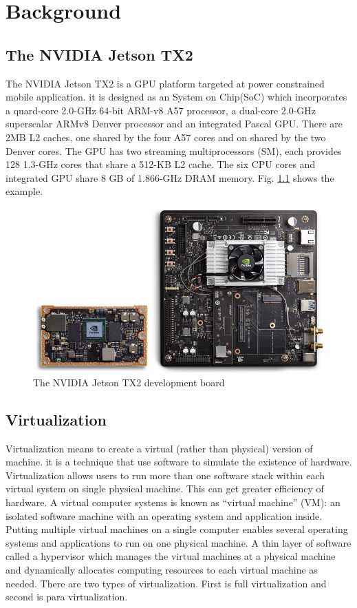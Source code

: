 \chapter{Background}
\label{chap:background}


\section{The NVIDIA Jetson TX2}
The NVIDIA Jetson TX2 is a GPU platform targeted at power constrained mobile application. it is designed as an System
on Chip(SoC) which incorporates a quard-core 2.0-GHz 64-bit ARM-v8 A57 processor, a dual-core 2.0-GHz superscalar ARMv8 Denver processor and an integrated Pascal GPU. There are 2MB L2 caches, one shared by the four A57 cores and on shared by the two Denver cores. The GPU has two streaming multiprocessors (SM), each provides 128 1.3-GHz cores that share a 512-KB L2 cache. The six CPU cores and integrated GPU share 8 GB of 1.866-GHz DRAM memory.
 Fig. \ref{fig:fig_2_1} shows the example.
\begin{figure}[!h]
    \centering
    \includegraphics[scale=0.4]{image/jetson_tx2.png}
    \caption{The NVIDIA Jetson TX2 development board}
    \label{fig:fig_2_1}
\end{figure}

\section{Virtualization}
Virtualization means to create a virtual (rather than physical) version of machine. it is a technique
that use software to simulate the existence of hardware. Virtualization allows users to run more than
one software stack within each virtual system on single physical machine.
This can get greater efficiency of hardware. A virtual computer systems is known as
“virtual machine” (VM): an isolated software machine with an operating system and application
inside. Putting multiple virtual machines on a single computer enables several operating systems and
applications to run on one physical machine. A thin layer of software called a hypervisor which
manages the virtual machines at a physical machine and dynamically allocates computing resources to
each virtual machine as needed. There are two types of virtualization. First is full virtualization
and second is para virtualization.

